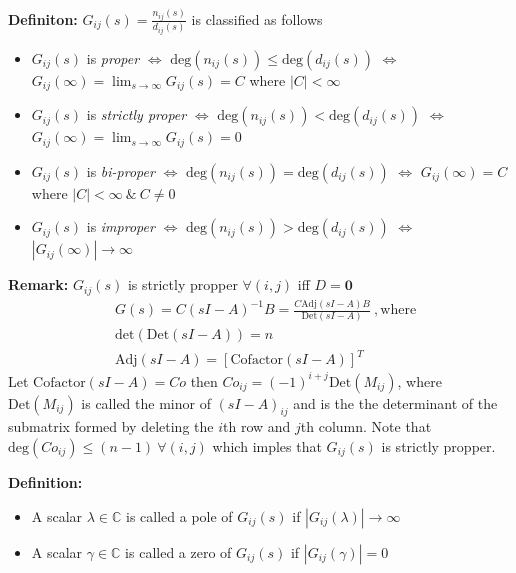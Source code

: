 \documentclass[twoside]{article}
\begin{document}
\textbf{Definiton:} $G_{ij}(s) = \frac{n_{ij}(s)}{d_{ij}(s)}$ is
classified as follows
%
\begin{itemize}
  \item $G_{ij}(s)$ is \textit{proper} $\Leftrightarrow$
    $\mathrm{deg}( n_{ij}(s) ) \leq \mathrm{deg}( d_{ij}(s) )$
    $\Leftrightarrow$ $G_{ij}(\infty) = \lim_{s \to \infty} G_{ij}(s)
    = C $ where $|C| < \infty$
  \item $G_{ij}(s)$ is \textit{strictly proper} $\Leftrightarrow$
    $\mathrm{deg}( n_{ij}(s) ) < \mathrm{deg}( d_{ij}(s) )$
    $\Leftrightarrow$ $G_{ij}(\infty) = \lim_{s \to \infty} G_{ij}(s)
    = 0 $ 
  \item $G_{ij}(s)$ is \textit{bi-proper} $\Leftrightarrow$
    $\mathrm{deg}( n_{ij}(s) ) = \mathrm{deg}( d_{ij}(s) )$
    $\Leftrightarrow$ $G_{ij}(\infty) 
    = C $ where $| C | < \infty \ \& \ C \neq 0$ 
  \item $G_{ij}(s)$ is \textit{improper} $\Leftrightarrow$
    $\mathrm{deg}( n_{ij}(s) ) > \mathrm{deg}( d_{ij}(s) )$
    $\Leftrightarrow $ $ | G_{ij}(\infty) | \to \infty $ 
\end{itemize}

\textbf{Remark:} $G_{ij}(s)$ is strictly propper $\forall (i,j)$ iff
$D = \mathbf{0}$
%
\begin{align*}
&G(s) = C \left( s I - A \right)^{-1} B =\frac{ C \mathrm{Adj}\left( s
       I - A \right) B}{ \mathrm{Det}\left( s
       I - A \right) } \ , \mathrm{where}
\\
&\mathrm{det} \left( \mathrm{Det}\left( s I - A \right) \right) = n
\\
&\mathrm{Adj}\left( s I - A \right) = \left[ \mathrm{Cofactor}\left(
  s I - A \right) \right]^T
\end{align*}
%
Let $ \mathrm{Cofactor}\left(
  s I - A \right) = Co$ then $Co_{ij} = (-1)^{i+j} \mathrm{Det}\left( M_{ij}
  \right)$, where $\mathrm{Det}\left( M_{ij} \right)$ is called the
  minor of $\left( s I - A \right)_{ij}$ and is the the determinant of
  the submatrix formed by deleting the $i$th row and $j$th column.
  Note that $\mathrm{deg}(Co_{ij}) \leq (n-1) \ \forall (i,j)$ which
  imples that $G_{ij}(s)$ is strictly propper.

\vspace{6pt}

\textbf{Definition:} 
\vspace{-6pt}
\begin{itemize}
\item A scalar $\lambda \in \mathbb{C}$ is called a pole of $G_{ij}(s)$ if $
| G_{ij}(\lambda) | \to \infty $
\item A scalar $\gamma \in \mathbb{C}$ is called a zero of $G_{ij}(s)$ if $
| G_{ij}(\gamma) | = 0 $
\end{itemize}
\end{document}
